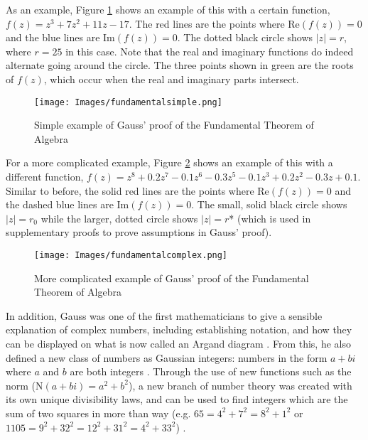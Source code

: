 \documentclass{article}
\begin{document}
As an example, Figure \ref{simplefundamental} shows an example of this with a certain function, \(f(z) = z^3 + 7z^2 +11z - 17\). The red lines are the points where Re\((f(z)) = 0\) and the blue lines are Im\((f(z)) = 0\). The dotted black circle shows \(|z| = r\), where \(r = 25\) in this case. Note that the real and imaginary functions do indeed alternate going around the circle. The three points shown in green are the roots of \(f(z)\), which occur when the real and imaginary parts intersect.

\begin{figure}[H]
  \centering
  \texttt{[image: Images/fundamentalsimple.png]}
  \caption{Simple example of Gauss' proof of the Fundamental Theorem of Algebra}
  \label{simplefundamental}
\end{figure}

For a more complicated example, Figure \ref{complicatedfundamental} \cite{fundamentaltheorem} shows an example of this with a different function, \(f(z) = z^8 + 0.2z^7 - 0.1z^6 - 0.3z^5 - 0.1z^3 + 0.2z^2 - 0.3z + 0.1\). Similar to before, the solid red lines are the points where Re\((f(z)) = 0\) and the dashed blue lines are Im\((f(z)) = 0\). The small, solid black circle shows \(|z| = r_0\) while the larger, dotted circle shows \(|z| = r\)* (which is used in supplementary proofs to prove assumptions in Gauss' proof).

\begin{figure}[H]
  \centering
  \texttt{[image: Images/fundamentalcomplex.png]}
  \caption{More complicated example of Gauss' proof of the Fundamental Theorem of Algebra}
  \label{complicatedfundamental}
\end{figure}

In addition, Gauss was one of the first mathematicians to give a sensible explanation of complex numbers, including establishing notation, and how they can be displayed on what is now called an Argand diagram \cite{menofmaths}. From this, he also defined a new class of numbers as Gaussian integers: numbers in the form \(a + bi\) where \(a\) and \(b\) are both integers \cite{gaussianintegers}. Through the use of new functions such as the norm (N\((a + bi) = a^2 + b^2\)), a new branch of number theory was created with its own unique divisibility laws, and can be used to find integers which are the sum of two squares in more than way (e.g. \(65 = 4^2 + 7^2 = 8^2 + 1^2\) or \(1105 = 9^2 + 32^2 = 12^2 + 31^2 = 4^2 + 33^2\)) \cite{gaussianintegers}.
\end{document}
